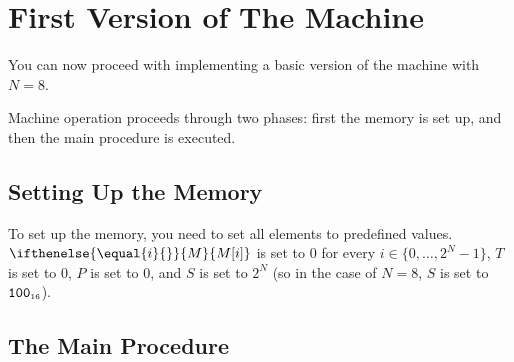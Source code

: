 \documentclass[a4paper,12pt]{article}
\newcommand{\num}[1]{\texttt{#1}}
\newcommand{\hex}[1]{\num{#1}_{\textup{\tiny 16}}}
\newcommand{\MEM}[1]{\ifthenelse{\equal{#1}{}}{M}{M[#1]}}
\newcommand{\PC}{P}
\newcommand{\SP}{S}
\newcommand{\TERM}{T}
\newcommand{\range}[2]{\{#1,\ldots,#2\}}
\begin{document}
\section{First Version of The Machine}

You can now proceed with implementing a basic version of the machine with $N=8$.

Machine operation proceeds through two phases: first the memory is set up, and then the main procedure is executed.

\subsection{Setting Up the Memory}

To set up the memory, you need to set all elements to predefined values.
$\MEM{i}$ is set to 0 for every $i \in \range{0}{2^N-1}$, $\TERM$ is set to 0, $\PC$ is set to $0$, and $\SP$ is set to $2^N$ (so in the case of $N=8$, $\SP$ is set to $\hex{100}$).

\subsection{The Main Procedure}
\end{document}
